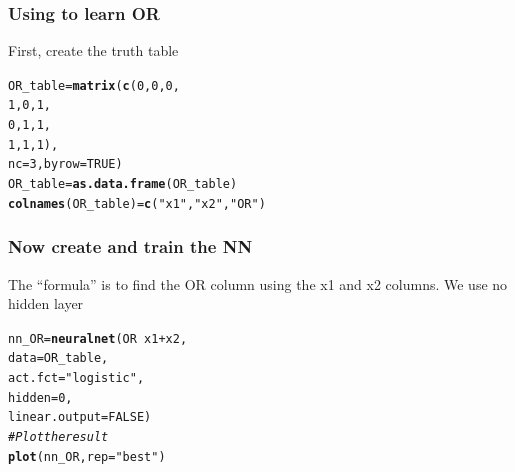 \documentclass[aspectratio=169]{beamer}\usepackage[]{graphicx}\usepackage[]{xcolor}
\makeatletter
\newcommand{\hlnum}[1]{\textcolor[rgb]{0.686,0.059,0.569}{#1}}%
\newcommand{\hlsng}[1]{\textcolor[rgb]{0.192,0.494,0.8}{#1}}%
\newcommand{\hlcom}[1]{\textcolor[rgb]{0.678,0.584,0.686}{\textit{#1}}}%
\newcommand{\hlopt}[1]{\textcolor[rgb]{0,0,0}{#1}}%
\newcommand{\hldef}[1]{\textcolor[rgb]{0.345,0.345,0.345}{#1}}%
\newcommand{\hlkwb}[1]{\textcolor[rgb]{0.69,0.353,0.396}{#1}}%
\newcommand{\hlkwc}[1]{\textcolor[rgb]{0.333,0.667,0.333}{#1}}%
\newcommand{\hlkwd}[1]{\textcolor[rgb]{0.737,0.353,0.396}{\textbf{#1}}}%
\newenvironment{kframe}{%
 \def\at@end@of@kframe{}%
 \ifinner\ifhmode%
  \def\at@end@of@kframe{\end{minipage}}%
  \begin{minipage}{\columnwidth}%
 \fi\fi%
 \def\FrameCommand##1{\hskip\@totalleftmargin \hskip-\fboxsep
 \colorbox{shadecolor}{##1}\hskip-\fboxsep
     \hskip-\linewidth \hskip-\@totalleftmargin \hskip\columnwidth}%
 \MakeFramed {\advance\hsize-\width
   \@totalleftmargin\z@ \linewidth\hsize
   \@setminipage}}%
 {\par\unskip\endMakeFramed%
 \at@end@of@kframe}
\newenvironment{knitrout}{}{} %
\makeatother
\begin{document}
\begin{frame}[fragile]\frametitle{Using  to learn OR}
First, create the truth table
\begin{knitrout}
\color{fgcolor}\begin{kframe}
\begin{alltt}
\hldef{OR_table} \hlkwb{=} \hlkwd{matrix}\hldef{(}\hlkwd{c}\hldef{(}\hlnum{0}\hldef{,} \hlnum{0}\hldef{,} \hlnum{0}\hldef{,}
                    \hlnum{1}\hldef{,} \hlnum{0}\hldef{,} \hlnum{1}\hldef{,}
                    \hlnum{0}\hldef{,} \hlnum{1}\hldef{,} \hlnum{1}\hldef{,}
                    \hlnum{1}\hldef{,} \hlnum{1}\hldef{,} \hlnum{1}\hldef{),}
                  \hlkwc{nc} \hldef{=} \hlnum{3}\hldef{,} \hlkwc{byrow} \hldef{=} \hlnum{TRUE}\hldef{)}
\hldef{OR_table} \hlkwb{=} \hlkwd{as.data.frame}\hldef{(OR_table)}
\hlkwd{colnames}\hldef{(OR_table)} \hlkwb{=} \hlkwd{c}\hldef{(}\hlsng{"x1"}\hldef{,} \hlsng{"x2"}\hldef{,} \hlsng{"OR"}\hldef{)}
\end{alltt}
\end{kframe}
\end{knitrout}
\end{frame}

\begin{frame}[fragile]\frametitle{Now create and train the NN}
The ``formula'' is to find the OR column using the x1 and x2 columns. We use no hidden layer
\vfill
\begin{knitrout}
\color{fgcolor}\begin{kframe}
\begin{alltt}
\hldef{nn_OR} \hlkwb{=} \hlkwd{neuralnet}\hldef{(OR} \hlopt{~} \hldef{x1} \hlopt{+} \hldef{x2,}
                  \hlkwc{data} \hldef{= OR_table,}
                  \hlkwc{act.fct} \hldef{=} \hlsng{"logistic"}\hldef{,}
                  \hlkwc{hidden} \hldef{=} \hlnum{0}\hldef{,}
                  \hlkwc{linear.output} \hldef{=} \hlnum{FALSE}\hldef{)}
\hlcom{# Plot the result}
\hlkwd{plot}\hldef{(nn_OR,} \hlkwc{rep} \hldef{=} \hlsng{"best"}\hldef{)}
\end{alltt}
\end{kframe}
\end{knitrout}
\end{frame}

\end{document}
